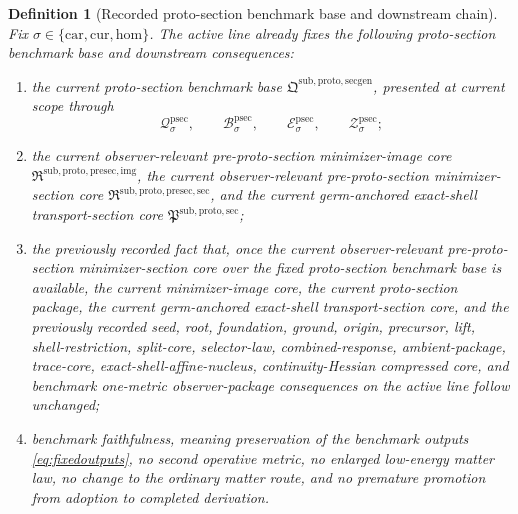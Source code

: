 \documentclass[11pt]{article}
\newcommand{\Car}{\mathrm{car}}
\newcommand{\Cur}{\mathrm{cur}}
\newcommand{\Hom}{\mathrm{hom}}
\newcommand{\ProtoSectionCore}{\mathfrak P^{\mathrm{sub,proto,sec}}}
\newcommand{\ProtoSectionPackage}{\mathfrak Q^{\mathrm{sub,proto,secgen}}}
\newcommand{\ProtoSectionState}[1]{\mathcal Q_{#1}^{\mathrm{psec}}}
\newcommand{\ProtoSectionBody}[1]{\mathcal B_{#1}^{\mathrm{psec}}}
\newcommand{\ProtoSectionFunctional}[1]{\mathscr E_{#1}^{\mathrm{psec}}}
\newcommand{\ProtoSectionShell}[1]{\mathcal Z_{#1}^{\mathrm{psec}}}
\newcommand{\PreProtoSectionImageCore}{\mathfrak R^{\mathrm{sub,proto,presec,img}}}
\newcommand{\PreProtoSectionMinSectionCore}{\mathfrak R^{\mathrm{sub,proto,presec,sec}}}
\newtheorem{definition}{Definition}
\begin{document}
\begin{definition}[Recorded proto-section benchmark base and downstream chain]
\label{def:downstream}
Fix \(\sigma\in\{\Car,\Cur,\Hom\}\). The active line already fixes the following proto-section benchmark base and downstream consequences:
\begin{enumerate}
    \item the current proto-section benchmark base \(\ProtoSectionPackage\), presented at current scope through
    \[
    \ProtoSectionState{\sigma},\qquad
    \ProtoSectionBody{\sigma},\qquad
    \ProtoSectionFunctional{\sigma},\qquad
    \ProtoSectionShell{\sigma};
    \]
    \item the current observer-relevant pre-proto-section minimizer-image core \(\PreProtoSectionImageCore\), the current observer-relevant pre-proto-section minimizer-section core \(\PreProtoSectionMinSectionCore\), and the current germ-anchored exact-shell transport-section core \(\ProtoSectionCore\);
    \item the previously recorded fact that, once the current observer-relevant pre-proto-section minimizer-section core over the fixed proto-section benchmark base is available, the current minimizer-image core, the current proto-section package, the current germ-anchored exact-shell transport-section core, and the previously recorded seed, root, foundation, ground, origin, precursor, lift, shell-restriction, split-core, selector-law, combined-response, ambient-package, trace-core, exact-shell-affine-nucleus, continuity-Hessian compressed core, and benchmark one-metric observer-package consequences on the active line follow unchanged;
    \item benchmark faithfulness, meaning preservation of the benchmark outputs \eqref{eq:fixedoutputs}, no second operative metric, no enlarged low-energy matter law, no change to the ordinary matter route, and no premature promotion from adoption to completed derivation.
\end{enumerate}
\end{definition}
\end{document}
